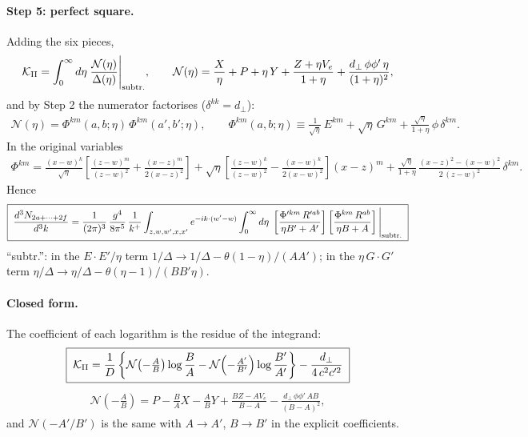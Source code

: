 \documentclass[10pt]{article}
\numberwithin{equation}{section}
\begin{document}
\paragraph{Step 5: perfect square.} Adding the six pieces,
\begin{align}
\mathcal{K}_{\rm II}=\int_{0}^{\infty}d\eta\;\frac{\mathcal{N}(\eta)}{\Delta(\eta)}\Bigg|_{\rm subtr.},\qquad
\mathcal{N}(\eta)=\frac{X}{\eta}+P+\eta\,Y+\frac{Z+\eta V_{e}}{1+\eta}+\frac{d_{\perp}\,\phi\phi'\,\eta}{(1+\eta)^{2}},
\end{align}
and by Step 2 the numerator factorises ($\delta^{kk}=d_{\perp}$):
\begin{align}
\mathcal{N}(\eta)=\Phi^{km}(a,b;\eta)\,\Phi^{km}(a',b';\eta),\qquad
\Phi^{km}(a,b;\eta)\equiv\frac{1}{\sqrt{\eta}}\,E^{km}+\sqrt{\eta}\,G^{km}+\frac{\sqrt{\eta}}{1+\eta}\,\phi\,\delta^{km}. \label{eq:Phi}
\end{align}
In the original variables
\begin{align}
\Phi^{km}=\frac{(x-w)^{k}}{\sqrt{\eta}}\left[\frac{(z-w)^{m}}{(z-w)^{2}}+\frac{(x-z)^{m}}{2(x-z)^{2}}\right]
+\sqrt{\eta}\left[\frac{(z-w)^{k}}{(z-w)^{2}}-\frac{(x-w)^{k}}{2(x-w)^{2}}\right](x-z)^{m}
+\frac{\sqrt{\eta}}{1+\eta}\,\frac{(x-z)^{2}-(x-w)^{2}}{2\,(z-w)^{2}}\,\delta^{km}.
\end{align}
Hence
\begin{align}
\boxed{\;\frac{d^{3}N_{2a+\dots+2f}}{d^{3}k}=\frac{1}{(2\pi)^{3}}\,\frac{g^{4}}{8\pi^{5}}\,\frac{1}{k^{+}}\int_{z,w,w',x,x'}e^{-ik\cdot(w'-w)}\int_{0}^{\infty}d\eta\;
\left[\frac{\Phi'^{km}\,R'^{ab}}{\eta B'+A'}\right]\left[\frac{\Phi^{km}\,R^{ab}}{\eta B+A}\right]\Bigg|_{\rm subtr.}\;} \label{eq:square}
\end{align}
``subtr.'': in the $E\cdot E'/\eta$ term $1/\Delta\to1/\Delta-\theta(1-\eta)/(AA')$; in the $\eta\,G\cdot G'$ term $\eta/\Delta\to\eta/\Delta-\theta(\eta-1)/(BB'\eta)$.

\paragraph{Closed form.} The coefficient of each logarithm is the residue of the integrand:
\begin{align}
\boxed{\;\mathcal{K}_{\rm II}=\frac{1}{D}\left\{\mathcal{N}\!\left(-\tfrac{A}{B}\right)\log\frac{B}{A}-\mathcal{N}\!\left(-\tfrac{A'}{B'}\right)\log\frac{B'}{A'}\right\}-\frac{d_{\perp}}{4\,c^{2}c'^{2}}\;} \label{eq:KIIclosed}
\end{align}
\begin{align}
\mathcal{N}\!\left(-\tfrac{A}{B}\right)=P-\frac{B}{A}X-\frac{A}{B}Y+\frac{BZ-AV_{e}}{B-A}-\frac{d_{\perp}\,\phi\phi'\,AB}{(B-A)^{2}},
\end{align}
and $\mathcal{N}(-A'/B')$ is the same with $A\to A'$, $B\to B'$ in the explicit coefficients.
\end{document}
